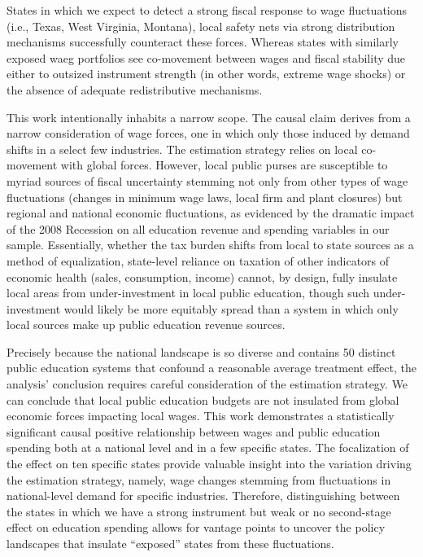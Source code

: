 \documentclass[
  10pt,
]{article}
\begin{document}
States in which we expect to detect a strong fiscal response to wage
fluctuations (i.e., Texas, West Virginia, Montana), local safety nets
via strong distribution mechanisms successfully counteract these forces.
Whereas states with similarly exposed waeg portfolios see co-movement
between wages and fiscal stability due either to outsized instrument
strength (in other words, extreme wage shocks) or the absence of
adequate redistributive mechanisms.

This work intentionally inhabits a narrow scope. The causal claim
derives from a narrow consideration of wage forces, one in which only
those induced by demand shifts in a select few industries. The
estimation strategy relies on local co-movement with global forces.
However, local public purses are susceptible to myriad sources of fiscal
uncertainty stemming not only from other types of wage fluctuations
(changes in minimum wage laws, local firm and plant closures) but
regional and national economic fluctuations, as evidenced by the
dramatic impact of the 2008 Recession on all education revenue and
spending variables in our sample. Essentially, whether the tax burden
shifts from local to state sources as a method of equalization,
state-level reliance on taxation of other indicators of economic health
(sales, consumption, income) cannot, by design, fully insulate local
areas from under-investment in local public education, though such
under-investment would likely be more equitably spread than a system in
which only local sources make up public education revenue sources.

Precisely because the national landscape is so diverse and contains 50
distinct public education systems that confound a reasonable average
treatment effect, the analysis' conclusion requires careful
consideration of the estimation strategy. We can conclude that local
public education budgets are not insulated from global economic forces
impacting local wages. This work demonstrates a statistically
significant causal positive relationship between wages and public
education spending both at a national level and in a few specific
states. The focalization of the effect on ten specific states provide
valuable insight into the variation driving the estimation strategy,
namely, wage changes stemming from fluctuations in national-level demand
for specific industries. Therefore, distinguishing between the states in
which we have a strong instrument but weak or no second-stage effect on
education spending allows for vantage points to uncover the policy
landscapes that insulate ``exposed'' states from these fluctuations.
\end{document}
